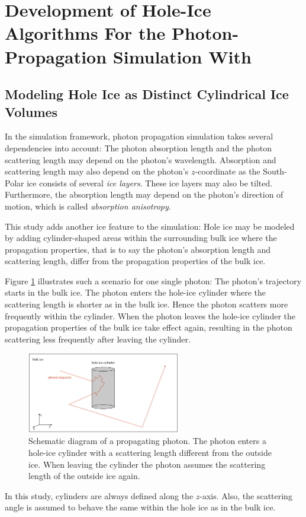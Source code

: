
\section{Development of Hole-Ice Algorithms For the Photon-Propagation Simulation With \clsim}
\label{sec:methods}

\subsection{Modeling Hole Ice as Distinct Cylindrical Ice Volumes}

In the \icecube simulation framework, photon propagation simulation takes several dependencies into account: The photon absorption length and the photon scattering length may depend on the photon's wavelength. Absorption and scattering length may also depend on the photon's $z$-coordinate as the South-Polar ice consists of several \textit{ice layers}. These ice layers may also be tilted. Furthermore, the absorption length may depend on the photon's direction of motion, which is called \textit{absorption anisotropy}.

This study adds another ice feature to the simulation: Hole ice may be modeled by adding cylinder-shaped areas within the surrounding bulk ice where the propagation properties, that is to say the photon's absorption length and scattering length, differ from the propagation properties of the bulk ice.

Figure \ref{fig:aiw2Thah} illustrates such a scenario for one single photon: The photon's trajectory starts in the bulk ice. The photon enters the hole-ice cylinder where the scattering length is shorter as in the bulk ice. Hence the photon scatters more frequently within the cylinder. When the photon leaves the hole-ice cylinder the propagation properties of the bulk ice take effect again, resulting in the photon scattering less frequently after leaving the cylinder.

\begin{figure}[htb]
  \centering
  \includegraphics[width=0.6\textwidth]{img/hole-ice-as-cylinder-shaped-areas}
  \caption{Schematic diagram of a propagating photon. The photon enters a hole-ice cylinder with a scattering length different from the outside ice. When leaving the cylinder the photon assumes the scattering length of the outside ice again.}
  \label{fig:aiw2Thah}
\end{figure}

In this study, cylinders are always defined along the $z$-axis. Also, the scattering angle is assumed to behave the same within the hole ice as in the bulk ice.

